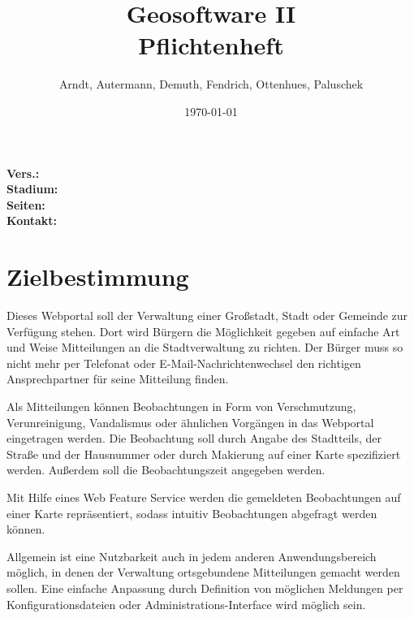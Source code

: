 \documentclass[a4paper,11pt]{scrartcl}
\begin{document}
\title{Geosoftware II \\ \small Pflichtenheft}
\author{Arndt, Autermann, Demuth, Fendrich, Ottenhues, Paluschek}
\date{\today}
\maketitle
\thispagestyle{empty}

\begin{center}
\bf Vers.: \MyVersion \\
\bf Stadium: \MyStatus\\
\bf Seiten: \thelastpage \\
\bf Kontakt: \email \\
\end{center}
\newpage

\tableofcontents

\newpage

\section{Zielbestimmung}
	Dieses Webportal soll der Verwaltung einer Großstadt, Stadt oder Gemeinde zur Verfügung stehen. Dort wird Bürgern die Möglichkeit gegeben auf einfache Art und Weise Mitteilungen an die Stadtverwaltung zu richten. Der Bürger muss so nicht mehr per Telefonat oder E-Mail-Nachrichtenwechsel den richtigen Ansprechpartner für seine Mitteilung  finden. 

	Als Mitteilungen können Beobachtungen in Form von Verschmutzung, Verunreinigung, Vandalismus oder ähnlichen Vorgängen in das Webportal eingetragen werden. Die Beobachtung soll durch Angabe des Stadtteils, der Straße und der Hausnummer oder durch Makierung auf einer Karte spezifiziert werden. Außerdem soll die Beobachtungszeit angegeben werden.

	Mit Hilfe eines Web Feature Service werden die gemeldeten Beobachtungen auf einer Karte repräsentiert, sodass intuitiv Beobachtungen abgefragt werden können.

	Allgemein ist eine Nutzbarkeit auch in jedem anderen Anwendungsbereich möglich, in denen der Verwaltung ortsgebundene Mitteilungen gemacht werden sollen. Eine einfache Anpassung durch Definition von möglichen Meldungen per Konfigurationsdateien oder  Administrations-Interface wird möglich sein.
\end{document}
